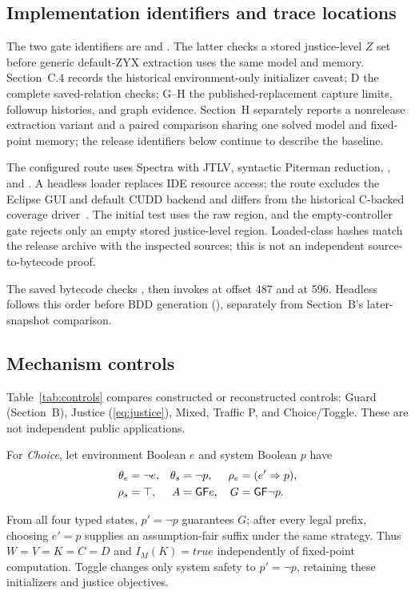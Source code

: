 \subsection{Implementation identifiers and trace locations}\label{sec:replication}
The two gate identifiers are
 and . The latter checks a stored
justice-level $Z$ set before generic default-ZYX extraction uses the same
model and memory. Section~C.4 records the historical environment-only
initializer caveat; D the complete saved-relation checks; G--H the
published-replacement capture limits, followup histories, and graph
evidence.
Section~H separately reports a nonrelease extraction variant and a
paired comparison sharing one solved model and fixed-point memory;
the release identifiers below continue to describe the baseline.

The configured route uses Spectra  with JTLV,
syntactic Piterman reduction, , and
. A headless loader replaces IDE resource access;
the route excludes the Eclipse GUI and default CUDD backend and differs
from the historical C-backed coverage driver~\cite{kindartifact}.
The initial test uses the raw region, and the empty-controller gate
rejects only an empty stored justice-level region.
Loaded-class hashes match the release archive with the inspected
sources; this is not an independent source-to-bytecode proof.

The saved  bytecode checks
, then invokes
 at offset 487 and
 at 596.
Headless  follows this order before BDD
generation (), separately from Section~B's
later-snapshot comparison.

\subsection{Mechanism controls}
Table~\ref{tab:controls} compares constructed or reconstructed controls: Guard (Section~B), Justice (\eqref{eq:justice}), Mixed, Traffic P, and Choice/Toggle. These are not independent public applications.

\begin{samepage}
For \emph{Choice}, let environment Boolean
$e$ and system Boolean $p$ have
\[
\begin{aligned}
\theta_e&=\neg e,&\theta_s&=\neg p,&\rho_e&=(e'\Rightarrow p),\\
\rho_s&=\top,&A&=\mathsf{G}\mathsf{F} e,&G&=\mathsf{G}\mathsf{F}\neg p.
\end{aligned}
\]
\end{samepage}
From all four typed states, $p'=\neg p$ guarantees $G$; after every legal prefix, choosing $e'=p$ supplies an assumption-fair suffix under the same strategy. Thus $W=V=K=C=D$ and $I_M(K)=\mathit{true}$ independently of fixed-point computation.
Toggle changes only system safety to $p'=\neg p$, retaining these initializers and justice objectives.

